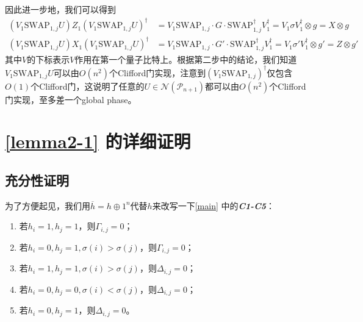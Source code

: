 \documentclass[8pt]{article}
\begin{document}
\begin{appendices}
因此进一步地，我们可以得到
\begin{equation}
\begin{split}
(V_1\text{SWAP}_{1, j}U)Z_1(V_1\text{SWAP}_{1, j}U)^{\dagger} &= V_1\text{SWAP}_{1, j} \cdot G \cdot \text{SWAP}_{1, j}^{\dagger}V_1^{\dagger} = V_1\sigma V_1^\dagger \otimes g = X \otimes g\\
(V_1\text{SWAP}_{1, j}U)X_1(V_1\text{SWAP}_{1, j}U)^{\dagger} &= V_1\text{SWAP}_{1, j} \cdot G' \cdot \text{SWAP}_{1, j}^{\dagger}V_1^{\dagger} = V_1\sigma' V_1^\dagger \otimes g' = Z \otimes g'
\end{split}
\end{equation}
其中$V$的下标表示$V$作用在第一个量子比特上。根据第二步中的结论，我们知道$V_1\text{SWAP}_{1, j}U$可以由$O(n^2)$个Clifford门实现，注意到$(V_1\text{SWAP}_{1, j})^{\dagger}$仅包含$O(1)$个Clifford门，这说明了任意的$U \in \mathcal N(\mathcal P_{n+1})$都可以由$O(n^2)$个Clifford门实现，至多差一个global phase。

\section{\cref{lemma2-1} 的详细证明}\label{proof2-1}
\subsection{充分性证明}
为了方便起见，我们用$\overline{h} = h \oplus 1^n$代替$h$来改写一下\cref{main} 中的\textbf{\textit{C1-C5}}：

\begin{enumerate}
	\renewcommand{\labelenumi}{\textbf{\textit{B\theenumi}} }
	\item 若$h_i = 1, h_j = 1$，则$\Gamma_{i, j} = 0$；
	\item 若$h_i = 0, h_j = 1, \sigma(i) > \sigma(j)$，则$\Gamma_{i, j} = 0$；
	\item 若$h_i = 1, h_j = 1, \sigma(i) > \sigma(j)$，则$\Delta_{i, j} = 0$；
	\item 若$h_i = 0, h_j = 0, \sigma(i) < \sigma(j)$，则$\Delta_{i, j} = 0$；
	\item 若$h_i = 0, h_j = 1$，则$\Delta_{i, j} = 0$。
\end{enumerate}


\end{appendices}
\end{document}

